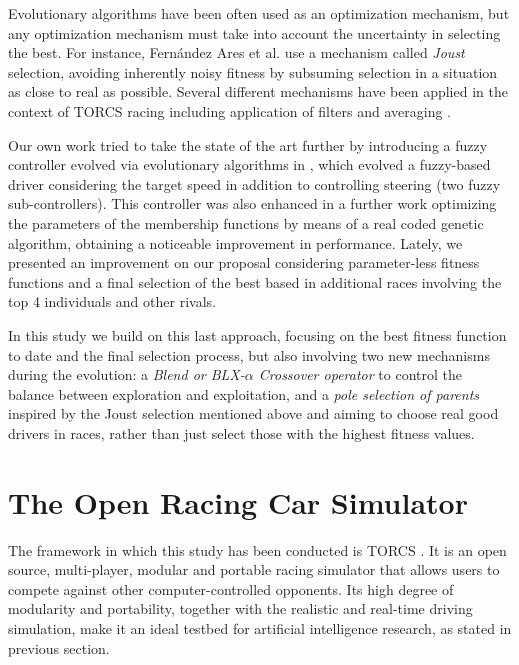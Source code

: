 \documentclass[conference]{IEEEtran}
\begin{document}
Evolutionary algorithms have been often used as an optimization
mechanism, but any optimization mechanism must take into account the
uncertainty in selecting the best. For instance, Fernández Ares et
al. \cite{DBLP:conf/evoW/Fernandez-AresG16} use a mechanism called
{\em Joust} selection, avoiding inherently noisy fitness by subsuming
selection in a situation as close to real as possible. Several
different mechanisms have been applied in the context of TORCS racing
including application of filters \cite{preuss2011torcs} and averaging
\cite{24}.

Our own work tried to take the state of the art further by introducing
a fuzzy controller evolved via evolutionary algorithms in
\cite{salem_evo17}, which evolved a fuzzy-based driver considering the
target speed in addition to controlling steering (two fuzzy
sub-controllers). 
This controller was also enhanced in a further work \cite{salem_evo18}
optimizing the parameters of the membership functions by means of a
real coded genetic algorithm, obtaining a noticeable improvement in
performance. Lately, we presented \cite{salem_cig2018} an improvement on our proposal considering parameter-less fitness functions and a final selection of the best based in additional races involving the top 4 individuals and other rivals.

In this study we build on this last approach, focusing on the best
fitness function to date and the final selection process, but also
involving two new mechanisms during the evolution: a \textit{Blend or BLX-$\alpha$
  Crossover operator} to control the balance between exploration and
exploitation, and a \textit{pole selection of parents} inspired by the
Joust selection mentioned above and aiming
to choose real good drivers in races, rather than just select those
with the highest fitness values. 



\section{The Open Racing Car Simulator}
\label{sec:torcs}

The framework in which this study has been conducted is TORCS \cite{torcs4}. It is an open source, multi-player, modular and portable racing simulator that allows users to compete against other computer-controlled opponents.
Its high degree of modularity and portability, together with the
realistic and real-time driving simulation, make it an ideal testbed
for artificial intelligence research, as stated in previous section.
\end{document}
